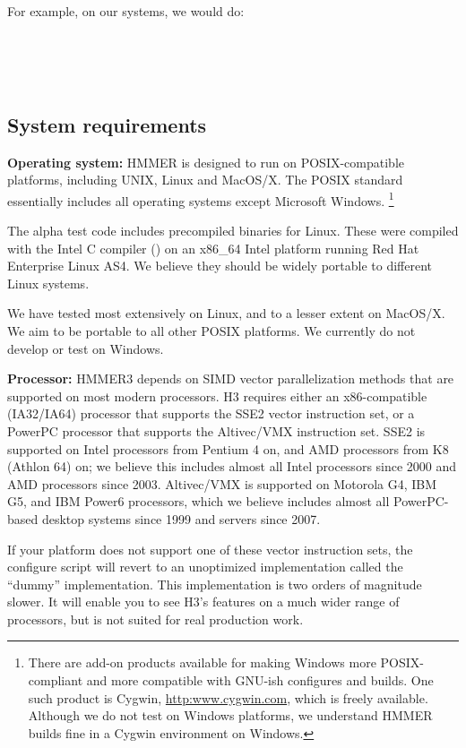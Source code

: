 For example, on our systems, we would do:

\\
\\
\\


\subsection{System requirements}

\textbf{Operating system:} HMMER is designed to run on
POSIX-compatible platforms, including UNIX, Linux and MacOS/X.  The
POSIX standard essentially includes all operating systems except
Microsoft Windows.
\footnote{There are add-on products available for making Windows more
  POSIX-compliant and more compatible with GNU-ish configures and
  builds. One such product is Cygwin, \url{http:www.cygwin.com}, which
  is freely available. Although we do not test on Windows platforms,
  we understand HMMER builds fine in a Cygwin environment on Windows.}

The alpha test code includes precompiled binaries for Linux. These
were compiled with the Intel C compiler () on an x86\_64
Intel platform running Red Hat Enterprise Linux AS4. We believe they
should be widely portable to different Linux systems. 

We have tested most extensively on Linux, and to a lesser extent on
MacOS/X. We aim to be portable to all other POSIX platforms. We
currently do not develop or test on Windows.


\textbf{Processor:} HMMER3 depends on SIMD vector parallelization
methods that are supported on most modern processors.  H3 requires
either an x86-compatible (IA32/IA64) processor that supports the SSE2
vector instruction set, or a PowerPC processor that supports the
Altivec/VMX instruction set. SSE2 is supported on Intel processors
from Pentium 4 on, and AMD processors from K8 (Athlon 64) on; we
believe this includes almost all Intel processors since 2000 and AMD
processors since 2003. Altivec/VMX is supported on Motorola G4, IBM
G5, and IBM Power6 processors, which we believe includes almost all
PowerPC-based desktop systems since 1999 and servers since 2007.

If your platform does not support one of these vector instruction
sets, the configure script will revert to an unoptimized
implementation called the ``dummy'' implementation. This
implementation is two orders of magnitude slower. It will enable you
to see H3's features on a much wider range of processors, but is not
suited for real production work.

